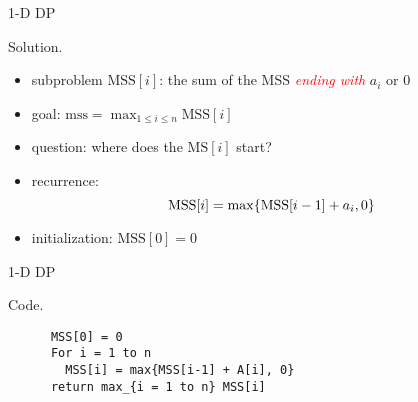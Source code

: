 \begin{frame}{1-D DP}
  \begin{block}{Solution.}
    \begin{itemize}
      \item subproblem $\text{MSS}[i]$: the sum of the MSS \textcolor{red}{\it ending with} $a_{i}$ or 0
      \item goal: $\text{mss} = \max_{1 \le i \le n} \text{MSS}[i]$
      \item<2-> question: where does the $\text{MS}[i]$ start?
      \item<2-> recurrence: 
	\[ 
	  \text{MSS}[i] = \max \{\text{MSS}[i-1] + a_{i}, 0\} 
	\]
      \item<3-> initialization: $\text{MSS}[0] = 0$
    \end{itemize}

  \end{block}
\end{frame}
\begin{frame}[fragile]{1-D DP}
  \begin{block}{Code.}
    \begin{verbatim}
      MSS[0] = 0
      For i = 1 to n
        MSS[i] = max{MSS[i-1] + A[i], 0}
      return max_{i = 1 to n} MSS[i]
    \end{verbatim}
  \end{block}

\end{frame}
